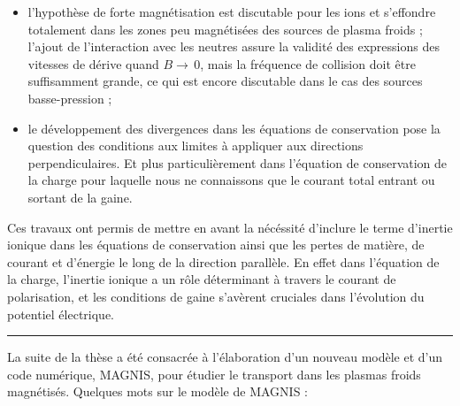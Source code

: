  \begin{itemize}
   \item l'hypothèse de forte magnétisation est discutable pour les ions
 et s'effondre totalement dans les zones peu magnétisées des sources de plasma
 froids ; l'ajout de l'interaction avec les neutres assure la validité des
 expressions des vitesses de dérive quand $B\rightarrow\,$0, mais la fréquence
 de collision doit être suffisamment grande, ce qui est encore discutable dans
 le cas des sources basse-pression ;
 \item le développement des divergences dans les équations de conservation pose
 la question des conditions aux limites à appliquer aux directions
 perpendiculaires.
 Et plus particulièrement dans l'équation de conservation de la charge pour
 laquelle nous ne connaissons que le courant total entrant ou sortant de la
 gaine. 
 \end{itemize}
   
 Ces travaux ont permis de mettre en avant la nécéssité d'inclure
 le terme d'inertie ionique dans les équations de conservation ainsi que les pertes de
 matière, de courant et d'énergie le long de la direction parallèle. En effet
 dans l'équation de la charge, l'inertie ionique a un rôle déterminant à travers
 le courant de polarisation, et les conditions de gaine s'avèrent cruciales
 dans l'évolution du potentiel électrique.
 
 \begin{center}
\rule{0.6\textwidth}{1pt}
\end{center}
 
 La suite de la thèse a été consacrée à l'élaboration d'un
 nouveau modèle et d'un code numérique, MAGNIS, pour étudier le transport
 dans les plasmas froids magnétisés. Quelques mots sur le modèle de
 MAGNIS :
 
